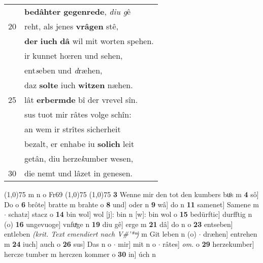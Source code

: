 \documentclass[8pt,a4paper,notitlepage]{article}
\begin{document}
\begin{table}[ht]
\begin{minipage}[t]{0.5\linewidth}
\begin{tabular}{rl}
 & \textbf{bedâhter gegenrede}, \textit{diu g}ê\\ 
20 & reht, als jenes \textbf{vrâgen} stê,\\ 
 & \textbf{der} \textbf{iuch} \textbf{dâ} wil mit worten spehen.\\ 
 & ir kunnet hœren und sehen,\\ 
 & ent\textit{s}eben und \textit{d}ræhen,\\ 
 & daz \textbf{solte} iuch \textbf{witzen} næhen.\\ 
25 & lât \textbf{erbermde} bî der vrevel sîn.\\ 
 & sus tuot mir râtes volge schîn:\\ 
 & an wem ir strîtes sicherheit\\ 
 & bezalt, er enhabe iu \textbf{solich} leit\\ 
 & getân, diu herze\textit{k}umber wesen,\\ 
30 & die nemt und lâzet in genesen.\\ 
\end{tabular}
\scriptsize
\line(1,0){75} \newline
m n o Fr69 \newline
\line(1,0){75} \newline
\newline
\line(1,0){75} \newline
\textbf{3} Wenne mir den tot den kumbers buͦs m \textbf{4} sô] Do o \textbf{6} brôte] bratte m brahte o \textbf{8} und] oder n \textbf{9} wâ] do n \textbf{11} samenet] Samene m  $\cdot$ schatz] stacz o \textbf{14} bin wol] wol [j]: bin n [w]: bin wol o \textbf{15} bedürftic] durfftig n (o) \textbf{16} ungevuoge] vnfuͯge n \textbf{19} diu gê] erge m \textbf{21} dâ] do n o \textbf{23} entseben] entleben \textit{(krit. Text emendiert nach V#'* ͫ)} m Git leben n (o)  $\cdot$ dræhen] entrehen m \textbf{24} iuch] auch o \textbf{26} sus] Das n o  $\cdot$ mir] mit n o  $\cdot$ râtes] \textit{om.} o \textbf{29} herzekumber] hercze tumber m herczen kommer o \textbf{30} in] úch n \newline
\end{minipage}
\end{table}
\newpage
\end{document}
